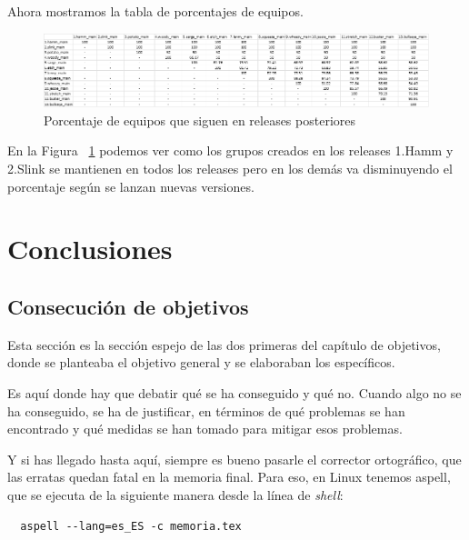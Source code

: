 \documentclass[a4paper, 12pt]{book}
\begin{document}
	Ahora mostramos la tabla de porcentajes de equipos.
	
	\begin{figure}[h]
		\centering
		\includegraphics[width=18cm, keepaspectratio]{img/Tabla porcentajes equipos.png}
		\caption{Porcentaje de equipos que siguen en releases posteriores}
		\label{fig:tabla_2}
	\end{figure}
	
	En la Figura  ~\ref{fig:tabla_2} podemos ver como los grupos creados en los releases 1.Hamm y 2.Slink se mantienen en todos los releases pero en los demás va disminuyendo el porcentaje según se lanzan nuevas versiones.

\cleardoublepage
\chapter{Conclusiones}
\label{chap:conclusiones}


\section{Consecución de objetivos}
\label{sec:consecucion-objetivos}

Esta sección es la sección espejo de las dos primeras del capítulo de objetivos, donde se planteaba el objetivo general y se elaboraban los específicos.

Es aquí donde hay que debatir qué se ha conseguido y qué no. 
Cuando algo no se ha conseguido, se ha de justificar, en términos de qué problemas se han encontrado y qué medidas se han tomado para mitigar esos problemas.

Y si has llegado hasta aquí, siempre es bueno pasarle el corrector ortográfico, que las erratas quedan fatal en la memoria final.
Para eso, en Linux tenemos aspell, que se ejecuta de la siguiente manera desde la línea de \emph{shell}:

\begin{verbatim}
  aspell --lang=es_ES -c memoria.tex
\end{verbatim}
\end{document}
